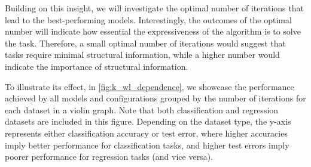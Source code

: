 Building on this insight, we will investigate the optimal number of \wl iterations that lead to the best-performing models. Interestingly, the outcomes of the optimal number will indicate how essential the expressiveness of the \wl algorithm is to solve the task. Therefore, a small optimal number of iterations would suggest that tasks require minimal structural information, while a higher number would indicate the importance of structural information.

To illustrate its effect, in \cref{fig:k_wl_dependence}, we showcase the performance achieved by all models and configurations grouped by the number of \wl iterations for each dataset in a violin graph. Note that both classification and regression datasets are included in this figure. Depending on the dataset type, the y-axis represents either classification accuracy or test error, where higher accuracies imply better performance for classification tasks, and higher test errors imply poorer performance for regression tasks (and vice versa).

